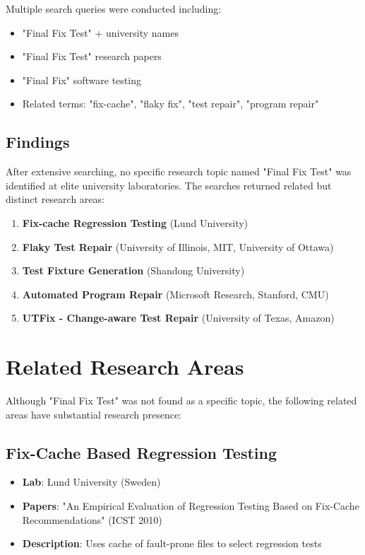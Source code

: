 \documentclass[12pt,a4paper]{article}
\begin{document}
Multiple search queries were conducted including:
\begin{itemize}
    \item "Final Fix Test" + university names
    \item "Final Fix Test" research papers
    \item "Final Fix" software testing
    \item Related terms: "fix-cache", "flaky fix", "test repair", "program repair"
\end{itemize}

\subsection{Findings}

After extensive searching, no specific research topic named "Final Fix Test" was identified at elite university laboratories. The searches returned related but distinct research areas:

\begin{enumerate}
    \item \textbf{Fix-cache Regression Testing} (Lund University)
    \item \textbf{Flaky Test Repair} (University of Illinois, MIT, University of Ottawa)
    \item \textbf{Test Fixture Generation} (Shandong University)
    \item \textbf{Automated Program Repair} (Microsoft Research, Stanford, CMU)
    \item \textbf{UTFix - Change-aware Test Repair} (University of Texas, Amazon)
\end{enumerate}

\section{Related Research Areas}

Although "Final Fix Test" was not found as a specific topic, the following related areas have substantial research presence:

\subsection{Fix-Cache Based Regression Testing}

\begin{itemize}
    \item \textbf{Lab}: Lund University (Sweden)
    \item \textbf{Papers}: "An Empirical Evaluation of Regression Testing Based on Fix-Cache Recommendations" (ICST 2010)
    \item \textbf{Description}: Uses cache of fault-prone files to select regression tests
\end{itemize}
\end{document}
